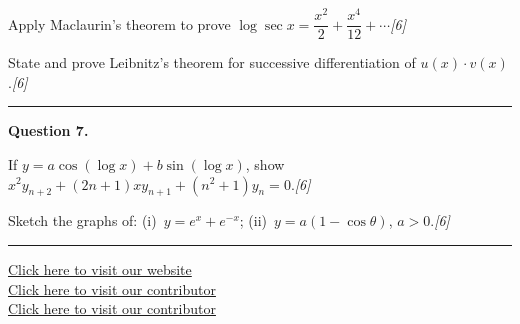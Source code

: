 \documentclass[11pt,a4paper]{article}
\newcommand{\pts}[1]{\hfill   \textit{[#1]}}
\begin{document}
\begin{parts}
  \item Apply Maclaurin's theorem to prove $\log\sec x=\dfrac{x^2}{2}+\dfrac{x^4}{12}+\cdots$\pts{6}
  \item State and prove Leibnitz's theorem for successive differentiation of $u(x)\cdot v(x)$.\pts{6}
\end{parts}
\medskip\rule{\linewidth}{0.2pt}

\medskip


\noindent   \textbf{Question 7.}

\begin{parts}
  \item If $y=a\cos(\log x)+b\sin(\log x)$, show $x^2y_{n+2}+(2n+1)xy_{n+1}+(n^2+1)y_n=0$.\pts{6}
  \item Sketch the graphs of: (i)~$y=e^x+e^{-x}$; (ii)~$y=a(1-\cos \theta)$, $a>0$.\pts{6}
\end{parts}

\vfill\rule{\linewidth}{0.4pt}

\begin{center}\small
\href{https://bhu-exam.vercel.app/}{Click here to visit our website}\\[4pt]
\href{https://me-aryan.vercel.app/}{Click here to visit our contributor}\\[4pt]
\href{https://quashan-me.vercel.app/}{Click here to visit our contributor}
\end{center}
\end{document}

